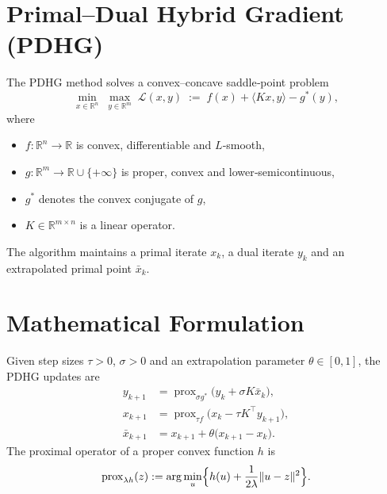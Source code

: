\documentclass{article}
\begin{document}
\section*{Primal–Dual Hybrid Gradient (PDHG)}
%
The PDHG method solves a convex–concave saddle‑point problem
\[
\min_{x\in\mathbb{R}^n}\; \max_{y\in\mathbb{R}^m}
\; \mathcal{L}(x,y)\;:=\; f(x)+\langle Kx,y\rangle - g^{*}(y),
\tag{P}
\]
where
\begin{itemize}
  \item $f:\mathbb{R}^n\to\mathbb{R}$ is convex, differentiable and $L$‑smooth,
  \item $g:\mathbb{R}^m\to\mathbb{R}\cup\{+\infty\}$ is proper, convex and lower‑semicontinuous,
  \item $g^{*}$ denotes the convex conjugate of $g$,
  \item $K\in\mathbb{R}^{m\times n}$ is a linear operator.
\end{itemize}
The algorithm maintains a primal iterate $x_k$, a dual iterate $y_k$ and an extrapolated primal point
$\bar{x}_k$.

\section*{Mathematical Formulation}
Given step sizes $\tau>0$, $\sigma>0$ and an extrapolation parameter $\theta\in[0,1]$,
the PDHG updates are
\begin{align}
    y_{k+1} &= \operatorname{prox}_{\sigma g^{*}}\!\bigl(y_k+\sigma K\bar{x}_k\bigr),
    \label{eq:dual-update}\\[4pt]
    x_{k+1} &= \operatorname{prox}_{\tau f}\!\bigl(x_k-\tau K^{\!\top} y_{k+1}\bigr),
    \label{eq:primal-update}\\[4pt]
    \bar{x}_{k+1} &= x_{k+1}+\theta\bigl(x_{k+1}-x_k\bigr).
    \label{eq:extrapolation}
\end{align}
The proximal operator of a proper convex function $h$ is
\[
\operatorname{prox}_{\lambda h}(z)
:=\arg\min_{u}\Bigl\{h(u)+\frac{1}{2\lambda}\|u-z\|^{2}\Bigr\}.
\]

\end{document}
